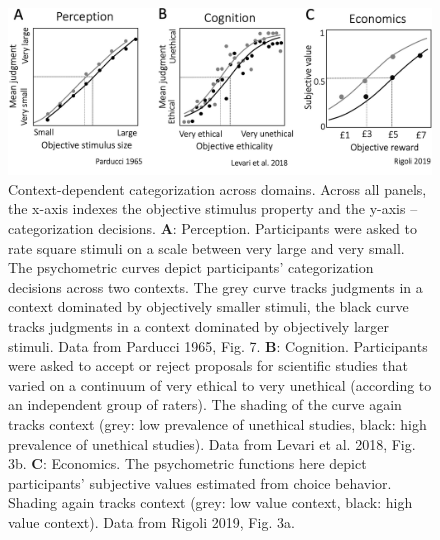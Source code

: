 \documentclass[a4paper, nobind]{templates/ociamthesis}
\begin{document}
\begin{figure}

{\centering \includegraphics[width=1\linewidth]{figures/cat-intro} 

}

\caption[Context-dependent categorization across domains]{Context-dependent categorization across domains. Across all panels, the x-axis indexes the objective stimulus property and the y-axis -- categorization decisions. $\textbf{A:}$ Perception. Participants were asked to rate square stimuli on a scale between very large and very small. The psychometric curves depict participants' categorization decisions across two contexts. The grey curve tracks judgments in a context dominated by objectively smaller stimuli, the black curve tracks judgments in a context dominated by objectively larger stimuli. Data from Parducci 1965, Fig. 7. $\textbf{B:}$ Cognition. Participants were asked to accept or reject proposals for scientific studies that varied on a continuum of very ethical to very unethical (according to an independent group of raters). The shading of the curve again tracks context (grey: low prevalence of unethical studies, black: high prevalence of unethical studies). Data from Levari et al. 2018, Fig. 3b. $\textbf{C:}$ Economics. The psychometric functions here depict participants' subjective values estimated from choice behavior. Shading again tracks context (grey: low value context, black: high value context). Data from Rigoli 2019, Fig. 3a.}\label{fig:cat-intro}
\end{figure}
\end{document}
